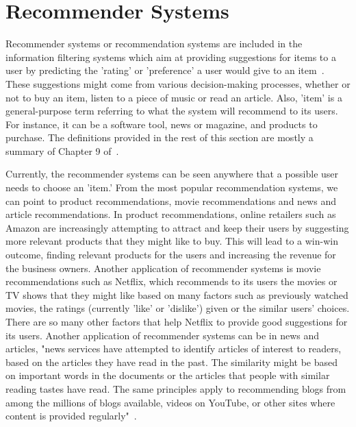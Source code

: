 







\section{Recommender Systems}

Recommender systems or recommendation systems are included in the information filtering systems which aim at providing suggestions for items to a user by predicting the 'rating' or 'preference' a user would give to an item~\cite{isinkaye2015recommendation,ricci2011introduction}. These suggestions might come from various decision-making processes, whether or not to buy an item, listen to a piece of music or read an article. Also, 'item' is a general-purpose term referring to what the system will recommend to its users. For instance, it can be a software tool, news or magazine, and products to purchase. The definitions provided in the rest of this section are mostly a summary of Chapter 9 of~\cite{rajaraman2011mining}.

Currently, the recommender systems can be seen anywhere that a possible user needs to choose an 'item.' From the most popular recommendation systems, we can point to product recommendations, movie recommendations and news and article recommendations. In product recommendations, online retailers such as Amazon are increasingly attempting to attract and keep their users by suggesting more relevant products that they might like to buy. This will lead to a win-win outcome, finding relevant products for the users and increasing the revenue for the business owners. Another application of recommender systems is movie recommendations such as Netflix, which recommends to its users the movies or TV shows that they might like based on many factors such as previously watched movies, the ratings (currently 'like' or 'dislike') given or the similar users' choices. There are so many other factors that help Netflix to provide good suggestions for its users. Another application of recommender systems can be in news and articles, "news services have attempted to identify articles of interest to readers, based on the articles they have read in the past. The similarity might be based on important words in the
documents or the articles that people with similar reading
tastes have read. The same principles apply to recommending blogs from among
the millions of blogs available, videos on YouTube, or other sites where content is provided regularly"~\cite{rajaraman2011mining}. 





